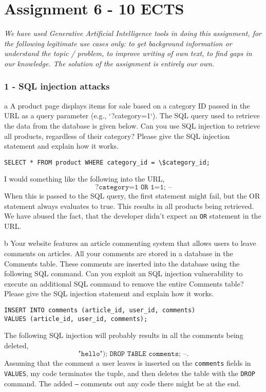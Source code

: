 \documentclass[working, oneside]{../../Preambles/tuftebook}
\begin{document}
\let\cleardoublepage\clearpage
\thispagestyle{fancy}
\chapter{Assignment 6 - 10 ECTS}
\textit{We have used Generative Artificial Intelligence tools in doing this
assignment, for the following legitimate use cases only: to get background
information or understand the topic / problem, to improve writing of own
text, to find gaps in our knowledge. The solution of the assignment is
entirely our own.}
\subsection*{1 - SQL injection attacks}
\begin{subexercise}{a}
A product page displays items for sale based on a category ID passed in the URL
as a query parameter (e.g., `?category=1`). The SQL query used to retrieve the
data from the database is given below. Can you use SQL injection to retrieve all
products, regardless of their category? Please give the SQL injection statement
and explain how it works.
\begin{lstlisting}
SELECT * FROM product WHERE category_id = \$category_id;
\end{lstlisting}
\end{subexercise}
\begin{solution}
I would something like the following into the URL,
\[
\texttt{?category=1 OR 1=1; --}
\] 
When this is passed to the SQL query, the first statement might fail, but the OR statement always evaluates to true. This results in all products being retrieved. We have abused the fact, that the developer didn't expect an \texttt{OR} statement in the URL.
\end{solution}
\begin{subexercise}{b}
Your website features an article commenting system that allows users to leave
comments on articles. All your comments are stored in a database in the
Comments table. These comments are inserted into the database using the
following SQL command. Can you exploit an SQL injection vulnerability to
execute an additional SQL command to remove the entire Comments table?
Please give the SQL injection statement and explain how it works.
\begin{lstlisting}
INSERT INTO comments (article_id, user_id, comments)
VALUES (article_id, user_id, comments);
\end{lstlisting}
\end{subexercise}
\begin{solution}
The following SQL injection will probably results in all the comments being deleted,
\[
    \texttt{"hello"); DROP TABLE comments; --}
.\] 
Assuming that the comment a user leaves is inserted on the \texttt{comments} fields in \texttt{VALUES}, my code terminates the tuple, and then deletes the table with the \texttt{DROP} command. The added  \texttt{--} comments out any code there might be at the end.
\end{solution}
\end{document}
